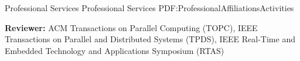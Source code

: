 \documentclass[letterpaper,MMMyyyy,nonstopmode]{simpleresumecv}
\begin{document}
\begin{Body}

\Section
{Professional Services}
{Professional Services}
{PDF:ProfessionalAffiliationsActivities}

\Entry
{\textbf{Reviewer:} ACM Transactions on Parallel Computing (TOPC), 
IEEE Transactions on Parallel and Distributed Systems (TPDS), IEEE Real-Time and Embedded Technology and 
Applications Symposium (RTAS)}



\begin{comment}

\Section
{Campus Activities}
{Campus Activities}
{PDF:CampusActivities}

\Entry
\href{http://www.example.com/my-club}
{\textbf{First Volunteers Club}},
First American University

\Gap
\BulletItem
President
\hfill
\DatestampYMD{2006}{08}{15} --
\DatestampYMD{2007}{08}{15}
\begin{Detail}
\SubBulletItem
Lorem ipsum dolor sit amet, consectetur adipiscing elit.
\SubBulletItem
Curabitur vitae laoreet velit, vel ultricies est. Nam nec elit ac ante facilisis ultrices.
\SubBulletItem
Integer sit amet turpis dolor. Lorem ipsum dolor sit amet, consectetur adipiscing elit. Nunc at orci eu leo vulputate finibus sed et sem.
\SubBulletItem
Suspendisse volutpat sapien et mi cursus, gravida ornare mauris sollicitudin.
\end{Detail}


\end{comment}
\end{Body}
\end{document}
